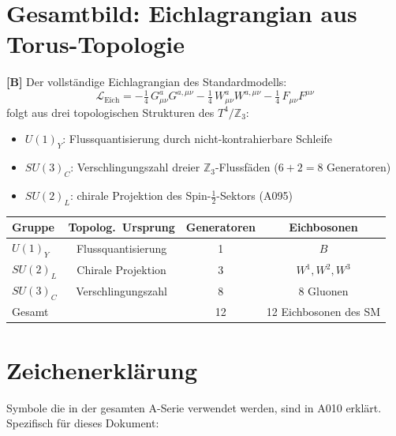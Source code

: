 \section{Gesamtbild: Eichlagrangian aus Torus-Topologie}

\textbf{[B]} Der vollständige Eichlagrangian des Standardmodells:
\[
  \mathcal{L}_\text{Eich}
  = -\tfrac14\,G_{\mu\nu}^a G^{a,\mu\nu}
  - \tfrac14\,W_{\mu\nu}^a W^{a,\mu\nu}
  - \tfrac14\,F_{\mu\nu}F^{\mu\nu}
\]
folgt aus drei topologischen Strukturen des $T^4/\mathbb{Z}_3$:
\begin{itemize}[leftmargin=2em,itemsep=2pt,topsep=2pt]
  \item $U(1)_Y$: Flussquantisierung durch nicht-kontrahierbare Schleife
  \item $SU(3)_C$: Verschlingungszahl dreier $\mathbb{Z}_3$-Flussfäden
    ($6+2=8$ Generatoren)
  \item $SU(2)_L$: chirale Projektion des Spin-$\tfrac12$-Sektors (A095)
\end{itemize}

\begin{center}
\renewcommand{\arraystretch}{1.3}
{\small\begin{tabular}{lccc}
\toprule
Gruppe & Topolog.\ Ursprung & Generatoren & Eichbosonen \\
\midrule
$U(1)_Y$    & Flussquantisierung & 1 & $B$ \\
$SU(2)_L$   & Chirale Projektion & 3 & $W^1,W^2,W^3$ \\
$SU(3)_C$   & Verschlingungszahl & 8 & 8 Gluonen \\
\midrule
Gesamt & & 12 & 12 Eichbosonen des SM \\
\bottomrule
\end{tabular}}
\renewcommand{\arraystretch}{1.0}
\end{center}

\section{Zeichenerklärung}

Symbole die in der gesamten A-Serie verwendet werden, sind in A010 erklärt.
Spezifisch für dieses Dokument:

